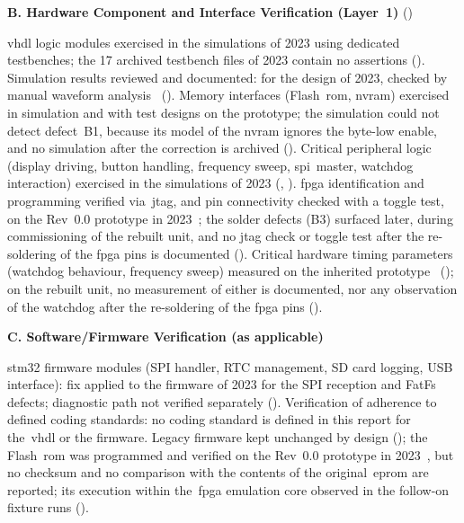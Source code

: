 \medskip
\noindent\textbf{B. Hardware Component and Interface Verification (Layer~1)} ()
\begin{checklist}
	 \gls{vhdl} logic modules exercised in the simulations of 2023 using dedicated testbenches; the 17 archived testbench files of 2023 contain no assertions ().
	 Simulation results reviewed and documented: for the design of 2023, checked by manual waveform analysis~\cite[Sec.~5.1]{leyer2023} ().
	 Memory interfaces (Flash~\gls{rom}, \gls{nvram}) exercised in simulation and with test designs on the prototype; the simulation could not detect defect~B1, because its model of the \gls{nvram} ignores the byte-low enable, and no simulation after the correction is archived ().
	 Critical peripheral logic (display driving, button handling, frequency sweep, \gls{spi}~master, watchdog interaction) exercised in the simulations of 2023 (, ).
	 \gls{fpga} identification and programming verified via~\gls{jtag}, and pin connectivity checked with a toggle test, on the Rev~0.0 prototype in 2023~\cite{leyer2023}; the solder defects (B3) surfaced later, during commissioning of the rebuilt unit, and no \gls{jtag} check or toggle test after the re-soldering of the \gls{fpga} pins is documented ().
	 Critical hardware timing parameters (watchdog behaviour, frequency sweep) measured on the inherited prototype~\cite{leyer2023} (); on the rebuilt unit, no measurement of either is documented, nor any observation of the watchdog after the re-soldering of the \gls{fpga} pins ().
\end{checklist}

\medskip
\noindent\textbf{C. Software/Firmware Verification (as applicable)}
\begin{checklist}
	 \gls{stm32} firmware modules (SPI handler, RTC management, SD card logging, USB interface): fix applied to the firmware of 2023 for the SPI reception and FatFs defects; diagnostic path not verified separately ().
	 Verification of adherence to defined coding standards: no coding standard is defined in this report for the~\gls{vhdl} or the firmware.
	 Legacy firmware kept unchanged by design (); the Flash~\gls{rom} was programmed and verified on the Rev~0.0 prototype in 2023~\cite[Sec.~4.3]{leyer2023}, but no checksum and no comparison with the contents of the original~\gls{eprom} are reported; its execution within the~\gls{fpga} emulation core observed in the follow-on fixture runs ().
\end{checklist}

